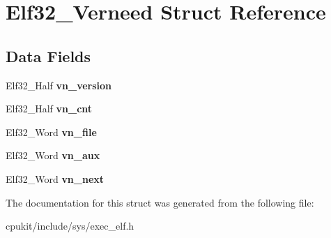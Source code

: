 \hypertarget{structElf32__Verneed}{}\section{Elf32\+\_\+\+Verneed Struct Reference}
\label{structElf32__Verneed}
\subsection*{Data Fields}
\begin{DoxyCompactItemize}
\item 
\mbox{\label{structElf32__Verneed_ae87cf6c64587fcf3cd80ba2f6aa6b1bb}} 
Elf32\+\_\+\+Half {\bfseries vn\+\_\+version}
\item 
\mbox{\label{structElf32__Verneed_a8c8c56b63ee1f38cf5568fa7bd5b4f73}} 
Elf32\+\_\+\+Half {\bfseries vn\+\_\+cnt}
\item 
\mbox{\label{structElf32__Verneed_a71c12598274c795cca809b99462e062a}} 
Elf32\+\_\+\+Word {\bfseries vn\+\_\+file}
\item 
\mbox{\label{structElf32__Verneed_a0db7ff11ee775f27ebb1e10a6affabb8}} 
Elf32\+\_\+\+Word {\bfseries vn\+\_\+aux}
\item 
\mbox{\label{structElf32__Verneed_ae3819b6239b81ed5c8ce4f8710176870}} 
Elf32\+\_\+\+Word {\bfseries vn\+\_\+next}
\end{DoxyCompactItemize}


The documentation for this struct was generated from the following file\+:\begin{DoxyCompactItemize}
\item 
cpukit/include/sys/exec\+\_\+elf.\+h\end{DoxyCompactItemize}
